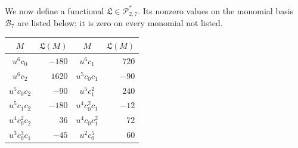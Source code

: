\documentclass[11pt]{amsart}
\theoremstyle{plain}
\theoremstyle{definition}
\theoremstyle{remark}
\numberwithin{equation}{section}
\theoremstyle{plain}
\begin{document}
We now define a functional
$\mathfrak L\in\mathscr P_{2,7}^{*}$.  Its nonzero values on the monomial
basis $\mathcal B_7$ are listed below; it is zero on every monomial not
listed.
\begin{center}
	\small
	\begin{tabular}{@{}c r @{\qquad} c r@{}}
		\toprule
		$M$ & $\mathfrak L(M)$ & $M$ & $\mathfrak L(M)$\\
		\midrule
		$u^6c_0$ & $-180$ & $u^6c_1$ & $720$\\
		$u^6c_2$ & $1620$ & $u^5c_0c_1$ & $-90$\\
		$u^5c_0c_2$ & $-90$ & $u^5c_1^2$ & $240$\\
		$u^5c_1c_2$ & $-180$ & $u^4c_0^2c_1$ & $-12$\\
		$u^4c_0^2c_2$ & $36$ & $u^4c_0c_1^2$ & $72$\\
		$u^3c_0^3c_1$ & $-45$ & $u^2c_0^5$ & $60$\\
		\bottomrule
	\end{tabular}
\end{center}
\end{document}
